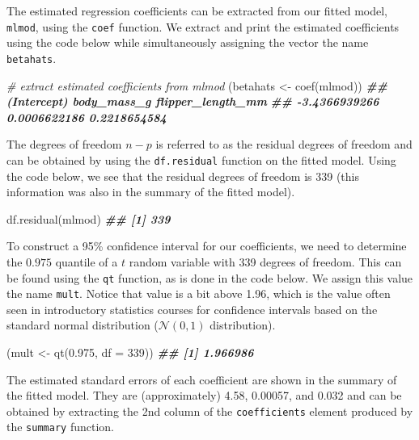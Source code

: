 \documentclass[
]{book}
\newenvironment{Shaded}{\begin{snugshade}}{\end{snugshade}}
\newcommand{\AttributeTok}[1]{\textcolor[rgb]{0.77,0.63,0.00}{#1}}
\newcommand{\CommentTok}[1]{\textcolor[rgb]{0.56,0.35,0.01}{\textit{#1}}}
\newcommand{\DecValTok}[1]{\textcolor[rgb]{0.00,0.00,0.81}{#1}}
\newcommand{\DocumentationTok}[1]{\textcolor[rgb]{0.56,0.35,0.01}{\textbf{\textit{#1}}}}
\newcommand{\FloatTok}[1]{\textcolor[rgb]{0.00,0.00,0.81}{#1}}
\newcommand{\FunctionTok}[1]{\textcolor[rgb]{0.00,0.00,0.00}{#1}}
\newcommand{\NormalTok}[1]{#1}
\newcommand{\OtherTok}[1]{\textcolor[rgb]{0.56,0.35,0.01}{#1}}
\theoremstyle{definition}
\theoremstyle{definition}
\theoremstyle{definition}
\theoremstyle{definition}
\theoremstyle{remark}
\begin{document}
The estimated regression coefficients can be extracted from our fitted model, \texttt{mlmod}, using the \texttt{coef} function. We extract and print the estimated coefficients using the code below while simultaneously assigning the vector the name \texttt{betahats}.

\begin{Shaded}
\begin{Highlighting}[]
\CommentTok{\# extract estimated coefficients from mlmod}
\NormalTok{(betahats }\OtherTok{\textless{}{-}} \FunctionTok{coef}\NormalTok{(mlmod))}
\DocumentationTok{\#\#       (Intercept)       body\_mass\_g flipper\_length\_mm }
\DocumentationTok{\#\#     {-}3.4366939266      0.0006622186      0.2218654584}
\end{Highlighting}
\end{Shaded}

The degrees of freedom \(n-p\) is referred to as the residual degrees of freedom and can be obtained by using the \texttt{df.residual} function on the fitted model. Using the code below, we see that the residual degrees of freedom is 339 (this information was also in the summary of the fitted model).

\begin{Shaded}
\begin{Highlighting}[]
\FunctionTok{df.residual}\NormalTok{(mlmod)}
\DocumentationTok{\#\# [1] 339}
\end{Highlighting}
\end{Shaded}

To construct a 95\% confidence interval for our coefficients, we need to determine the \(0.975\) quantile of a \(t\) random variable with 339 degrees of freedom. This can be found using the \texttt{qt} function, as is done in the code below. We assign this value the name \texttt{mult}. Notice that value is a bit above 1.96, which is the value often seen in introductory statistics courses for confidence intervals based on the standard normal distribution (\(\mathcal{N}(0,1)\) distribution).

\begin{Shaded}
\begin{Highlighting}[]
\NormalTok{(mult }\OtherTok{\textless{}{-}} \FunctionTok{qt}\NormalTok{(}\FloatTok{0.975}\NormalTok{, }\AttributeTok{df =} \DecValTok{339}\NormalTok{))}
\DocumentationTok{\#\# [1] 1.966986}
\end{Highlighting}
\end{Shaded}

The estimated standard errors of each coefficient are shown in the summary of the fitted model. They are (approximately) 4.58, 0.00057, and 0.032 and can be obtained by extracting the 2nd column of the \texttt{coefficients} element produced by the \texttt{summary} function.
\end{document}
